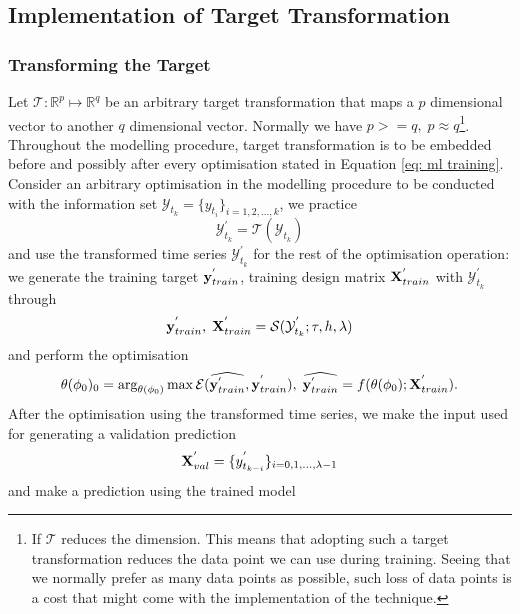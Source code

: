 \subsection{Implementation of Target Transformation}

\subsubsection{Transforming the Target}
Let $\mathcal{T}: \mathbb{R}^p \longmapsto \mathbb{R}^q$ be an arbitrary target transformation that maps a $p$ dimensional vector to another $q$ dimensional vector. Normally we have $p >= q, \; p \approx q$\footnote{If $\mathcal{T}$ reduces the dimension. This means that adopting such a target transformation reduces the data point we can use during training. Seeing that we normally prefer as many data points as possible, such loss of data points is a cost that might come with the implementation of the technique.}. Throughout the modelling procedure, target transformation is to be embedded before and possibly after every optimisation stated in Equation \ref{eq: ml training}. Consider an arbitrary optimisation in the modelling procedure to be conducted with the information set $\mathcal{Y}_{t_k} = \{ y_{t_i} \}_{i = 1, 2, \ldots, k}$, we practice
\begin{equation*}
    \mathcal{Y}^{'}_{t_k} = \mathcal{T}(\mathcal{Y}_{t_k})
\end{equation*}
and use the transformed time series $\mathcal{Y}^{'}_{t_k}$ for the rest of the optimisation operation: we generate the training target $\mathbf{y}^{'}_{train}$, training design matrix $\mathbf{X}^{'}_{train}$ with $\mathcal{Y}^{'}_{t_k}$ through
\begin{equation*}
    \mathbf{y}^{'}_{train}, \; \mathbf{X}^{'}_{train} = \mathcal{S}(\mathcal{Y}^{'}_{t_k}; \tau, h, \lambda)
\end{equation*}
and perform the optimisation
\begin{equation*}
    \theta(\phi_0)_0 = \arg_{\theta(\phi_0)} \max \mathcal{E}(\widehat{\mathbf{y}^{'}_{train}}, \mathbf{y}^{'}_{train}), \; \widehat{\mathbf{y}^{'}_{train}} = f(\theta(\phi_0); \mathbf{X}^{'}_{train}).
\end{equation*}
After the optimisation using the transformed time series, we make the input used for generating a validation prediction
\begin{equation*}
    \mathbf{X}^{'}_{val} = \{y^{'}_{t_{k-i}} \}_{i = 0, 1, \ldots, \lambda-1}
\end{equation*}
and make a prediction using the trained model
